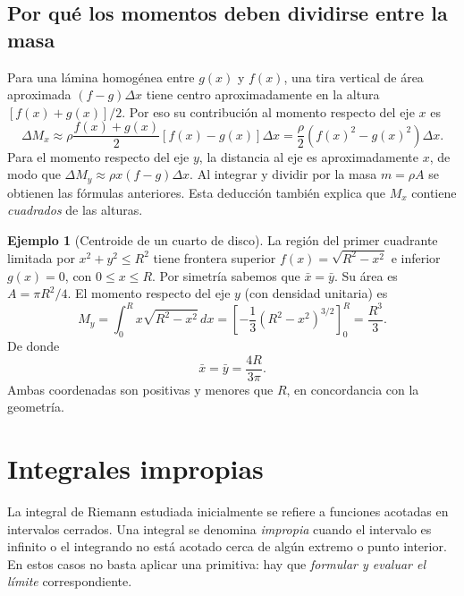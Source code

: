 \documentclass[12pt]{article}
\theoremstyle{definition}
\newtheorem{ejemplo}[teorema]{Ejemplo}
\theoremstyle{remark}
\begin{document}
\subsection*{Por qué los momentos deben dividirse entre la masa}
Para una lámina homogénea entre $g(x)$ y $f(x)$, una tira vertical de área aproximada $(f-g)\Delta x$ tiene centro aproximadamente en la altura $[f(x)+g(x)]/2$. Por eso su contribución al momento respecto del eje $x$ es
\[
\Delta M_x\approx\rho\frac{f(x)+g(x)}2[f(x)-g(x)]\Delta x
=\frac\rho2(f(x)^2-g(x)^2)\Delta x.
\]
Para el momento respecto del eje $y$, la distancia al eje es aproximadamente $x$, de modo que $\Delta M_y\approx\rho x(f-g)\Delta x$. Al integrar y dividir por la masa $m=\rho A$ se obtienen las fórmulas anteriores. Esta deducción también explica que $M_x$ contiene \emph{cuadrados} de las alturas.
\begin{ejemplo}[Centroide de un cuarto de disco]
La región del primer cuadrante limitada por $x^2+y^2\le R^2$ tiene frontera superior $f(x)=\sqrt{R^2-x^2}$ e inferior $g(x)=0$, con $0\le x\le R$. Por simetría sabemos que $\bar x=\bar y$. Su área es $A=\pi R^2/4$. El momento respecto del eje $y$ (con densidad unitaria) es
\[
M_y=\int_0^R x\sqrt{R^2-x^2}\,dx
=\left[-\frac13(R^2-x^2)^{3/2}\right]_0^R=\frac{R^3}{3}.
\]
De donde
\[
\boxed{\bar x=\bar y=\frac{4R}{3\pi}}.
\]
Ambas coordenadas son positivas y menores que $R$, en concordancia con la geometría.
\end{ejemplo}



\section{Integrales impropias}
La integral de Riemann estudiada inicialmente se refiere a funciones acotadas en intervalos cerrados. Una integral se denomina \emph{impropia} cuando el intervalo es infinito o el integrando no está acotado cerca de algún extremo o punto interior. En estos casos no basta aplicar una primitiva: hay que \emph{formular y evaluar el límite} correspondiente.
\end{document}
